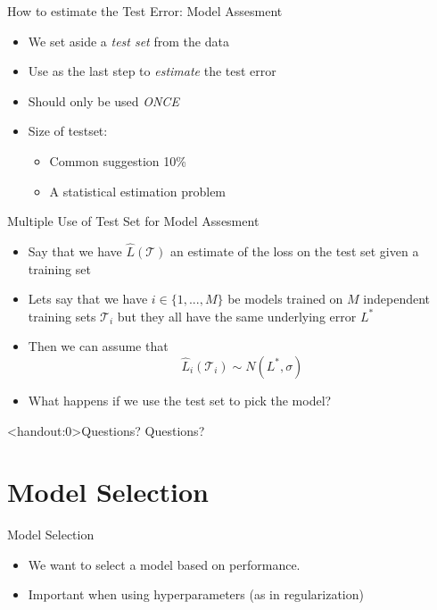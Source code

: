 \documentclass[10pt,handout]{beamer}
\begin{document}
\begin{frame}{How to estimate the Test Error: Model Assesment}

\begin{itemize}
\item We set aside a \emph{test set} from the data
\item Use as the last step to \emph{estimate} the test error
\item Should only be used \emph{ONCE}\pause
\item Size of testset:
\begin{itemize}
\item Common suggestion 10\%
\item A statistical estimation problem
\end{itemize}
\end{itemize}

\end{frame}

\begin{frame}{Multiple Use of Test Set for Model Assesment}

\begin{itemize}
\item Say that we have $\hat{L}(\mathcal{T})$ an estimate of the loss on the test set given a training set
\item Lets say that we have $i \in \{1,...,M\}$ be models trained on $M$ independent training sets $\mathcal{T}_i$ but they all have the same underlying error $L^*$
\item Then we can assume that
\[
\hat{L}_i(\mathcal{T}_i) \sim N(L^*, \sigma)
\]
\item What happens if we use the test set to pick the model?
\end{itemize}

\end{frame}

\begin{frame}<handout:0>{Questions?}
Questions?
\end{frame}



\section{Model Selection}
\frame{\sectionpage}


\begin{frame}{Model Selection}
\begin{itemize}
\item We want to select a model based on performance.
\item Important when using hyperparameters (as in regularization)
\end{itemize}

\end{frame}
\end{document}
